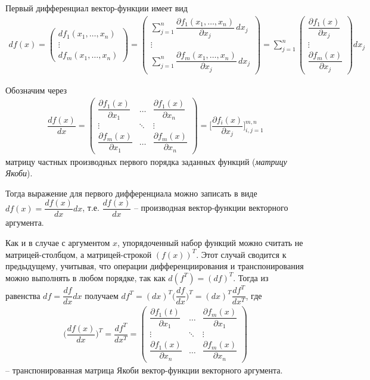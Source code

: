 \documentclass[%
	11pt,
	a4paper,
	utf8,
		]{article}
\begin{document}
Первый дифференциал вектор-функции имеет вид
\begin{align*}
	df(x) =
	\begin{pmatrix}
		df_1(x_1, \ldots, x_n) \\
		\vdots \\
		df_m(x_1, \ldots, x_n)
	\end{pmatrix}
	=
	\begin{pmatrix}
		\sum\limits_{j=1}^{n} \dfrac{\partial f_1(x_1, \ldots, x_n)}{\partial x_j} \, dx_j\\
		\vdots \\
		\sum\limits_{j=1}^{n} \dfrac{\partial f_m(x_1, \ldots, x_n)}{\partial x_j} \, dx_j
	\end{pmatrix} = \sum_{j=1}^{n}
    \begin{pmatrix}
    	\dfrac{\partial f_1(x)}{\partial x_j} \\
    	\vdots \\
    	\dfrac{\partial f_m(x)}{\partial x_j} 
    \end{pmatrix}
    dx_j
\end{align*}

Обозначим через
\begin{align*}
	\dfrac{df(x)}{dx} =
	\begin{pmatrix}
		\dfrac{\partial f_1(x)}{\partial x_1} & \ldots & \dfrac{\partial f_1(x)}{\partial x_n} \\
		\vdots & \ddots & \vdots \\
		\dfrac{\partial f_m(x)}{\partial x_1} & \ldots & \dfrac{\partial f_m(x)}{\partial x_n}
	\end{pmatrix} =
    \Bigg[ \dfrac{\partial f_i(x)}{\partial x_j} \Bigg]_{i,j=1}^{m, n}
\end{align*}
матрицу частных производных первого порядка заданных функций (\emph{матрицу Якоби}).

Тогда выражение для первого дифференциала можно записать в виде $ df(x) = \dfrac{df(x)}{dx} dx $, т.е. $ \dfrac{df(x)}{dx} $ -- производная вектор-функции векторного аргумента.

Как и в случае с аргументом $ x $, упорядоченный набор функций можно считать не матрицей-столбцом, а матрицей-строкой $ (f(x))^T $. Этот случай сводится к предыдущему, учитывая, что операции дифференциирования и транспонирования можно выполнять в любом порядке, так как $ d(f^T) = (df)^T $. Тогда из равенства $ df = \dfrac{df}{dx}dx $ получаем $ df^T = (dx)^T \Big( \dfrac{df}{dx} \Big)^T = (dx)^T \dfrac{df^T}{dx^T} $, где
\begin{align*}
	\Big( \dfrac{df(x)}{dx}\Big)^T = \dfrac{df^T}{dx^T} =
	\begin{pmatrix}
		\dfrac{\partial f_1(t)}{\partial x_1} & \ldots & \dfrac{\partial f_m(x)}{\partial x_1} \\
		\vdots & \ddots & \vdots \\
		\dfrac{\partial f_1(x)}{\partial x_n} & \ldots & \dfrac{\partial f_m(x)}{\partial x_n}
	\end{pmatrix}
\end{align*}
-- транспонированная матрица Якоби вектор-функции векторного аргумента.
\end{document}
